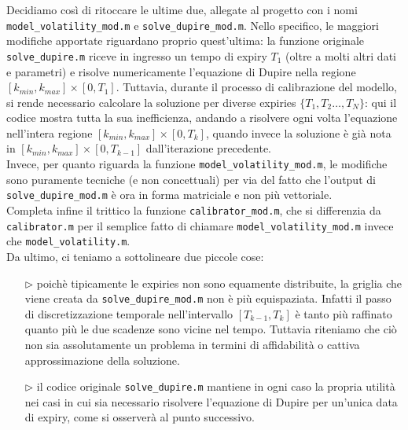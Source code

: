 \documentclass[11pt]{article}
\begin{document}
Decidiamo così di ritoccare le ultime due, allegate al progetto con i nomi \texttt{model\_volatility\_mod.m} e \texttt{solve\_dupire\_mod.m}. Nello specifico, le maggiori modifiche apportate riguardano proprio quest'ultima: la funzione originale \texttt{solve\_dupire.m} riceve in ingresso un tempo di expiry $T_1$ (oltre a molti altri dati e parametri) e risolve numericamente l'equazione di Dupire nella regione $[k_{min},k_{max}]\times[0,T_1]$. Tuttavia, durante il processo di calibrazione del modello, si rende necessario calcolare la soluzione per diverse expiries $\{T_1, T_2\dots, T_N\}$: qui il codice mostra tutta la sua inefficienza, andando a risolvere ogni volta l'equazione nell'intera regione $[k_{min},k_{max}]\times[0,T_k]$, quando invece la soluzione è già nota in $[k_{min},k_{max}]\times[0,T_{k-1}]$ dall'iterazione precedente.\\

Invece, per quanto riguarda la funzione \texttt{model\_volatility\_mod.m}, le modifiche sono puramente tecniche (e non concettuali) per via del fatto che l'output di \texttt{solve\_dupire\_mod.m} è ora in forma matriciale e non più vettoriale.\\

Completa infine il trittico la funzione \texttt{calibrator\_mod.m}, che si differenzia da \texttt{calibrator.m} per il semplice fatto di chiamare \texttt{model\_volatility\_mod.m} invece che \texttt{model\_volatility.m}.\\

Da ultimo, ci teniamo a sottolineare due piccole cose:

\begin{itemize}
	\item[$\rhd$] poichè tipicamente le expiries non sono equamente distribuite, la griglia che viene creata da \texttt{solve\_dupire\_mod.m} non è più equispaziata. Infatti il passo di discretizzazione temporale nell'intervallo $[T_{k-1},T_k]$ è tanto più raffinato quanto più le due scadenze sono vicine nel tempo. Tuttavia riteniamo che ciò non sia assolutamente un problema in termini di affidabilità o cattiva approssimazione della soluzione.

	\item[$\rhd$] il codice originale \texttt{solve\_dupire.m} mantiene in ogni caso la propria utilità nei casi in cui sia necessario risolvere l'equazione di Dupire per un'unica data di expiry, come si osserverà al punto successivo.
\end{itemize}
\end{document}
